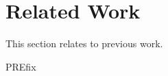\section{Related Work}
\label{s:relwk}

This section relates \sys to previous work.

PREfix~\cite{moy:prefix}
